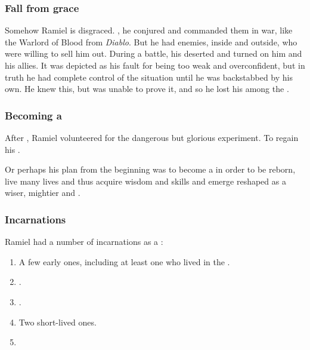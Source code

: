 \subsubsection{Fall from grace}
Somehow Ramiel is disgraced. 
, he conjured \daemons{} and commanded them in war, like the Warlord of Blood from \emph{Diablo}. 
But he had enemies, inside \Mystraacht{} and outside, who were willing to sell him out. 
During a battle, his \daemons{} deserted and turned on him and his allies. 
It was depicted as his fault for being too weak and overconfident, but in truth he had complete control of the situation until he was backstabbed by his own. 
He knew this, but was unable to prove it, and so he lost his \honour among the \resphain. 





\subsubsection{Becoming a \malach}
After , Ramiel volunteered for the dangerous but glorious \Malach{} experiment. 
To regain his \honour. 

Or perhaps his plan from the beginning was to become a \malach{} in order to be reborn, live many lives and thus acquire wisdom and skills and emerge reshaped as a wiser, mightier \resphan{} and \vertex. 





\subsubsection{Incarnations}
Ramiel had a number of incarnations as a \malach: 

\begin{enumerate}
  \item 
    A few early ones, including at least one who lived in the \VaimonCaliphate. 
  \item 
    .
  \item 
    .
  \item 
    Two short-lived ones. 
  \item 
\end{enumerate}






